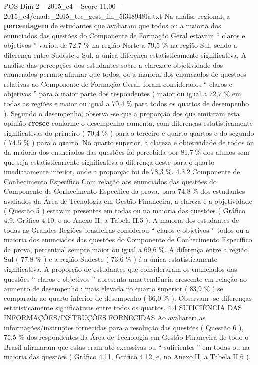 \begin{textsample}{POS Dim 2 – 2015\_c4 – Score 11.00 – 2015\_c4/enade\_2015\_tec\_gest\_fin\_5f348948fa.txt}
Na análise regional, a \textbf{percentagem} de estudantes que avaliaram que todos ou a maioria dos enunciados das questões do Componente de Formação Geral estavam “ claros e objetivos ” variou de 72,7 \% na região Norte a 79,5 \% na região Sul, sendo a diferença entre Sudeste e Sul, a única diferença estatisticamente significativa.
A análise das percepções dos estudantes sobre a clareza e objetividade dos enunciados permite afirmar que todos, ou a maioria dos enunciados de questões relativas ao Componente de Formação Geral, foram considerados “ claros e objetivos ” para a maior parte dos respondentes ( maior ou igual a 72,7 \% em todas as regiões e maior ou igual a 70,4 \% para todos os quartos de desempenho ).
Segundo o desempenho, observa -se que a proporção dos que emitiram esta opinião \textbf{cresce} conforme o desempenho aumenta, com diferenças estatisticamente significativas do primeiro ( 70,4 \% ) para o terceiro e quarto quartos e do segundo ( 74,5 \% ) para o quarto.
No quarto superior, a clareza e objetividade de todos ou da maioria dos enunciados das questões foi percebida por 81,7 \% dos alunos sem que seja estatisticamente significativa a diferença deste para o quarto imediatamente inferior, onde a proporção foi de 78,3 \%. 4.3.2 Componente de Conhecimento Específico Com relação aos enunciados das questões do Componente de Conhecimento Específico da prova, para 74,8 \% dos estudantes avaliados da Área de Tecnologia em Gestão Financeira, a clareza e a objetividade ( Questão 5 ) estavam presentes em todas ou na maioria das questões ( Gráfico 4.9, Gráfico 4.10, e no Anexo II, a Tabela II.5 ).
A maioria dos estudantes de todas as Grandes Regiões brasileiras considerou “ claros e objetivos ” todos ou a maioria dos enunciados das questões do Componente de Conhecimento Específico da prova, percentual sempre maior ou igual a 69,6 \%.
A diferença entre a região Sul ( 77,8 \% ) e a região Sudeste ( 73,6 \% ) é a única estatisticamente significativa.
A proporção de estudantes que consideraram os enunciados das questões “ claros e objetivos ” apresenta uma tendência crescente em relação ao aumento de desempenho : mais elevada no quarto superior ( 83,9 \% ) se comparada ao quarto inferior de desempenho ( 66,0 \% ).
Observam -se diferenças estatisticamente significativas entre todos os quartos. 4.4 SUFICIÊNCIA DAS INFORMAÇÕES/INSTRUÇÕES FORNECIDAS Ao avaliarem as informações/instruções fornecidas para a resolução das questões ( Questão 6 ), 75,5 \% dos respondentes da Área de Tecnologia em Gestão Financeira de todo o Brasil afirmaram que estas eram até excessivas ou “ suficientes ” em todas ou na maioria das questões ( Gráfico 4.11, Gráfico 4.12, e, no Anexo II, a Tabela II.6 ).

\end{textsample}
